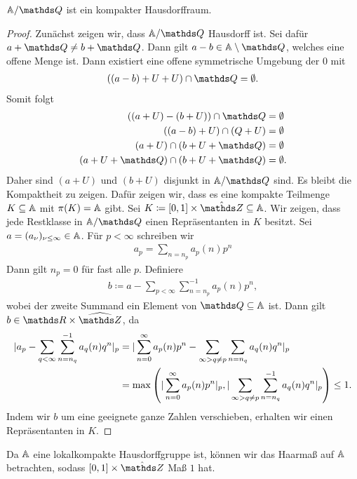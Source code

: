 \begin{prop}
$\A/\Q$ ist ein kompakter Hausdorffraum.
\end{prop}
\begin{proof}
Zunächst zeigen wir, dass $\A/\Q$ Hausdorff ist.
Sei dafür $a+\Q\not = b+\Q$. Dann gilt $a-b \in \mathbb{A}\setminus \Q$, welches eine offene Menge ist.
Dann existiert eine offene symmetrische Umgebung der $0$ mit
\begin{align*}
((a-b)+U+U)\cap \Q=\emptyset.
\end{align*}
Somit folgt
\begin{align*}
((a+U)-(b+U))\cap \Q &= \emptyset\\
((a-b)+U)\cap (Q+ U)&=\emptyset\\
(a+U)\cap (b+U+\Q)&=\emptyset\\
(a+U+\Q)\cap (b+U+\Q)&=\emptyset.
\end{align*}
Daher sind $(a+U)$ und $(b+U)$ disjunkt in $\A/\Q$ sind.
Es bleibt die Kompaktheit zu zeigen.
Dafür zeigen wir, dass es eine kompakte Teilmenge $K \subseteq \mathbb{A}$ mit $\pi(K)=\mathbb{A}$ gibt.
Sei $K\coloneqq [0,1]\times \hat{\Z}\subseteq \A$.
Wir zeigen, dass jede Restklasse in $\A/\Q$ einen Repräsentanten in $K$ besitzt.
Sei $a=(a_\nu)_{\nu \leq \infty} \in \mathbb{A}$. Für $p<\infty$ schreiben wir
\begin{align*}
a_p=\sum_{n=n_p} a_p(n)p^n
\end{align*}
Dann gilt $n_p=0$ für fast alle $p$.
Definiere
\begin{align*}
b\coloneqq a- \sum_{p<\infty}\sum_{n=n_p}^{-1} a_p(n)p^n,
\end{align*}
wobei der zweite Summand ein Element von $\Q \subseteq \A$ ist.
Dann gilt $b \in \R \times \widehat{\Z}$, da
\begin{align*}
|a_p-\sum_{q<\infty} \sum_{n=n_q}^{-1} a_q(n)q^n|_p&
=|\sum_{n=0}^\infty a_p(n)p^n-\sum_{\infty>q\not =p} \sum_{n=n_q} a_q(n)q^n|_p\\
&=\max \left(|\sum_{n=0}^\infty a_p(n)p^n|_p,|\sum_{\infty>q\not =p} \sum_{n=n_q}^{-1} a_q(n)q^n|_p\right) \leq 1.
\end{align*}
Indem wir $b$ um eine geeignete ganze Zahlen verschieben, erhalten wir einen Repräsentanten in $K$.
\end{proof}

Da $\mathbb{A}$ eine lokalkompakte Hausdorffgruppe ist, können wir das Haarmaß auf $\mathbb{A}$ betrachten, sodass $[0,1]\times \hat{\Z}$ Maß $1$ hat.

